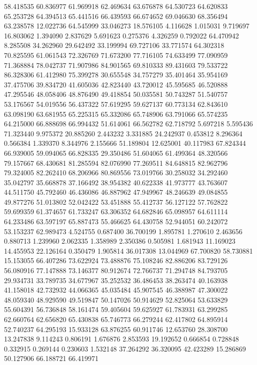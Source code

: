 58.418535
60.836977
61.969918
62.469634
63.676878
64.530723
64.620833
65.253728
64.394513
65.441516
66.439593
66.674652
69.046630
68.356494
63.238578
12.022736
64.545999
33.046273
18.576105
4.116628
1.015031
9.719697
16.803062
1.394090
2.837629
5.691623
0.275376
4.326259
0.792022
64.470942
8.285508
34.262960
29.642492
33.199994
69.727106
33.771574
64.302318
70.825595
61.061543
72.326769
71.673200
77.716105
74.633499
77.090959
71.368884
78.042737
71.907986
84.901565
69.810333
89.431603
79.533722
86.328306
61.412980
75.399278
30.655548
34.757279
35.401464
35.954169
37.475706
39.834720
41.605036
42.823440
43.720012
45.595685
46.520888
47.295546
48.058406
48.876490
49.418854
50.035581
50.743287
51.540757
53.176567
54.019556
56.437322
57.619295
59.627137
60.773134
62.843610
63.098190
63.681955
65.225315
65.332086
65.748906
63.791066
65.574235
64.215000
66.888698
66.994432
51.614061
66.562782
62.718792
5.697218
5.595436
71.323440
9.975372
20.885260
2.443232
3.331885
24.242937
0.453812
8.296364
0.566384
1.339370
8.344976
2.155666
51.189804
12.625001
40.117983
67.824344
66.939005
59.094065
66.828335
29.350486
51.604065
61.499364
48.320566
79.157667
68.430681
81.285594
82.076990
77.269511
84.648815
82.962796
79.324005
82.262410
68.206966
80.869556
73.019766
30.258032
34.292460
35.042797
35.668878
37.166492
38.954382
40.622338
41.973777
43.763607
44.511750
45.792460
46.436086
46.887962
47.949967
48.246639
49.084855
49.877276
51.013802
52.042422
53.451888
55.412737
56.127122
57.762822
59.699359
61.374657
61.733247
63.306352
64.682846
65.098957
64.611114
64.233486
63.597197
65.887473
55.466625
64.430758
52.944051
60.242072
53.153237
62.989473
4.524755
0.687400
36.700199
1.895781
1.270610
2.463656
0.880713
1.239960
2.062335
1.358989
2.350386
0.505981
1.681943
11.169023
14.455953
22.126164
0.350479
1.905814
36.017308
13.044969
67.700820
58.730881
15.153055
66.407286
73.622924
73.488876
75.108246
82.886206
83.729126
56.080916
77.147888
73.146377
80.912674
72.766737
71.294748
84.793705
29.934731
33.789735
34.677967
35.252532
36.486453
38.263474
40.163938
41.158018
42.732932
44.066365
45.035484
45.907545
46.388987
47.300022
48.059340
48.929590
49.519847
50.147026
50.914629
52.825064
53.633829
55.604391
56.736848
58.161474
59.405604
59.625927
61.783931
63.299285
62.660764
62.656820
65.430838
65.746773
66.279244
62.417802
64.895914
52.740237
64.295193
15.933128
63.876255
60.911746
12.653760
28.308700
13.247838
9.114243
0.806191
1.676876
2.853593
19.192652
0.666854
0.728848
0.332915
0.269144
0.230603
1.532148
37.264292
36.320095
42.423289
15.286869
50.127906
66.188721
66.419971
